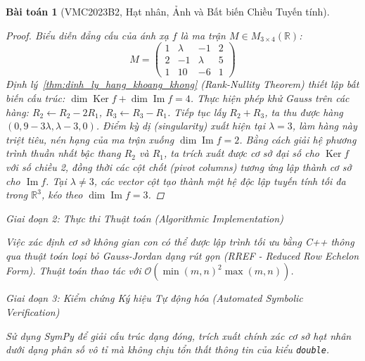 \documentclass{article}
\newtheorem{baitoan}{Bài toán}
\begin{document}
\begin{baitoan}[VMC2023B2, Hạt nhân, Ảnh và Bất biến Chiều Tuyến tính]
\begin{proof}
 Biểu diễn đẳng cấu của ánh xạ $f$ là ma trận $M \in M_{3 \times 4}(\mathbb{R})$:
 \begin{equation*}
 M = \begin{pmatrix} 1 & \lambda & -1 & 2 \\ 2 & -1 & \lambda & 5 \\ 1 & 10 & -6 & 1 \end{pmatrix}
 \end{equation*}
 Định lý~\ref{thm:dinh_ly_hang_khoang_khong} (Rank-Nullity Theorem) thiết lập bất biến cấu trúc: $\dim \operatorname{Ker}f + \dim \operatorname{Im}f = 4$.
 Thực hiện phép khử Gauss trên các hàng: 
 $R_2 \gets R_2 - 2R_1$, $R_3 \gets R_3 - R_1$. Tiếp tục lấy $R_2 + R_3$, ta thu được hàng $(0, 9-3\lambda, \lambda-3, 0)$. 
 Điểm kỳ dị (singularity) xuất hiện tại $\lambda = 3$, làm hàng này triệt tiêu, nén hạng của ma trận xuống $\dim \operatorname{Im}f = 2$. Bằng cách giải hệ phương trình thuần nhất bậc thang $R_2$ và $R_1$, ta trích xuất được cơ sở đại số cho $\operatorname{Ker}f$ với số chiều 2, đồng thời các cột chốt (pivot columns) tương ứng lập thành cơ sở cho $\operatorname{Im}f$. Tại $\lambda \neq 3$, các vector cột tạo thành một hệ độc lập tuyến tính tối đa trong $\mathbb{R}^3$, kéo theo $\dim \operatorname{Im}f = 3$.
 \end{proof}

\vspace{0.5em}\noindent\emph{Giai đoạn 2: Thực thi Thuật toán (Algorithmic Implementation)}
 
 Việc xác định cơ sở không gian con có thể được lập trình tối ưu bằng C++ thông qua thuật toán loại bỏ Gauss-Jordan dạng rút gọn (RREF - Reduced Row Echelon Form). Thuật toán thao tác với $\mathcal{O}(\min(m, n)^2 \max(m, n))$.



\vspace{0.5em}\noindent\emph{Giai đoạn 3: Kiểm chứng Ký hiệu Tự động hóa (Automated Symbolic Verification)}
 
 Sử dụng \textsf{SymPy} để giải cấu trúc dạng đóng, trích xuất chính xác cơ sở hạt nhân dưới dạng phân số vô tỉ mà không chịu tổn thất thông tin của kiểu \texttt{double}.




\end{baitoan}
\end{document}
